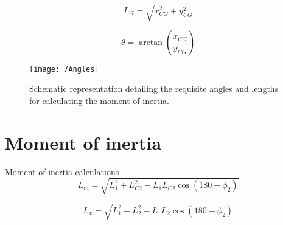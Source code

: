 %

\begin{equation}
	L_G = \sqrt{x_{CG}^2 + y_{CG}^2}
\end{equation}

\begin{equation}
	\theta = \arctan\left(\frac{{x_{CG}}}{{y_{CG}}}\right)
\end{equation}


\begin{figure}[h]
	\centering
	\texttt{[image: /Angles]}
	\caption[Moment of inertia Schematic representation]{Schematic representation detailing the requisite angles and lengths for calculating the moment of inertia.}
	\label{fig:Schematic representation detailing the requisite angles and lengths for calculating the moment of inertia.}
\end{figure}

\section{Moment of inertia}
Moment of inertia calculations 
\begin{equation}
	L_m = \sqrt{L_1^2 + L_{C2}^2 - L_1 L_{C2} \cos(180 - \phi_2)}
\end{equation}

\begin{equation}
	L_{x} = \sqrt{L_1^2 + L_2^2 - L_1 L_2 \cos(180 - \phi_2)}
\end{equation}


